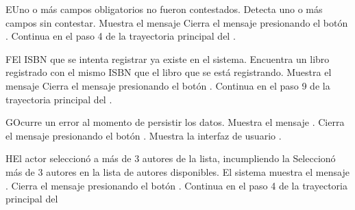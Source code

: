 \begin{UCtrayectoriaA}{E}{Uno o más campos obligatorios no fueron contestados.}
    \UCpaso Detecta uno o más campos sin contestar.
    \UCpaso Muestra el mensaje 
    \UCpaso[\UCactor] Cierra el mensaje presionando el botón .
    \UCpaso Continua en el paso 4 de la trayectoria principal del .
\end{UCtrayectoriaA}


\begin{UCtrayectoriaA}{F}{El ISBN que se intenta registrar ya existe en el sistema.}
    \UCpaso Encuentra un libro registrado con el mismo ISBN que el libro que se está registrando.
    \UCpaso Muestra el mensaje 
    \UCpaso[\UCactor] Cierra el mensaje presionando el botón .
    \UCpaso Continua en el paso 9 de la trayectoria principal del .
\end{UCtrayectoriaA}


\begin{UCtrayectoriaA}{G}{Ocurre un error al momento de persistir los datos.}
	\UCpaso Muestra el mensaje .
	\UCpaso[\UCactor] Cierra el mensaje presionando el botón .
	\UCpaso Muestra la interfaz de usuario .
\end{UCtrayectoriaA}


\begin{UCtrayectoriaA}{H}{El actor seleccionó a más de 3 autores de la lista, incumpliendo la }
    \UCpaso[\UCactor] Seleccionó más de 3 autores en la lista de autores disponibles.
    \UCpaso El sistema muestra el mensaje .
	\UCpaso[\UCactor] Cierra el mensaje presionando el botón .
	\UCpaso Continua en el paso 4 de la trayectoria principal del 
\end{UCtrayectoriaA}